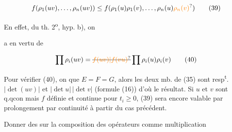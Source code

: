 
\[
f(\rho_1(uv),\ldots,\rho_n(uv))\leq f(\rho_1(u)\rho_1(v),\ldots,\rho_n(u)\unsure{\rho_n(v)})
\tag*{(39)}
\]

En effet,   du th. 2\textsuperscript{o}, hyp. b), on



a en vertu de

\[
\prod\rho_i(uv)=\deleted{\unsure{f(uv)|f(vu)}}\prod\rho_i(u)\rho_i(v)\tag*{(40)}
\]

 Pour vérifier (40), on    que $E=F=G$, alors les deux mb. de (35) sont resp\textsuperscript{t}. $|\det(uv)|$ et $|\det u|\,|\det v|$ (formule (16)) d'où le résultat. Si $u$ et $v$ sont q.qcon mais $f$ définie et continue pour $t_i\geq0$, (39) sera encore valable par prolongement par continuité à partir du cas précédent.

Donner des  sur la composition des opérateurs comme multiplication

